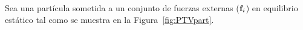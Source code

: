 Sea una partícula sometida a un conjunto de fuerzas externas (${\bf f}_i$) en equilibrio estático tal como se muestra en la Figura~\ref{fig:PTVpart}. %

%

%
%
%
%
%
%
%
%
%


